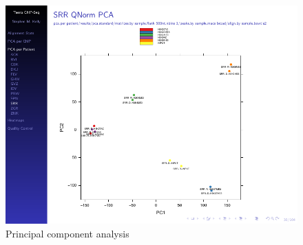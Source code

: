\documentclass[final]{beamer}
\newlength{\onecolwid}
\newlength{\twocolwid}
\begin{document}
\begin{frame}[t]
\begin{columns}[t]
\begin{column}{\twocolwid}
\begin{columns}[t,totalwidth=\twocolwid]
\begin{column}{\onecolwid}%

%	

\begin{beamerboxesrounded}{}%


\begin{figure}
\includegraphics[width=1.0\linewidth, frame]{./Figures/PCA_report}
\caption{Principal component analysis}

\label{fig:PCA}
\end{figure}





\end{beamerboxesrounded}
\end{column}
\end{columns}
\end{column}
\end{columns}
\end{frame}
\end{document}
